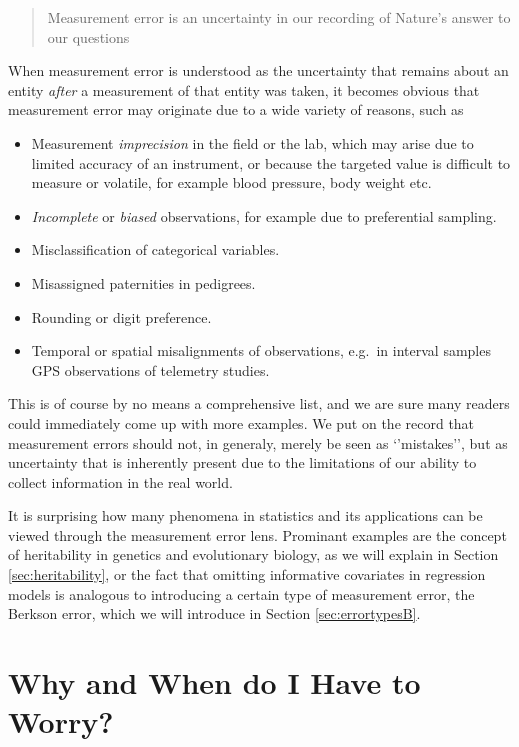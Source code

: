 \documentclass[]{book}
\providecommand{\tightlist}{%
  \setlength{\itemsep}{0pt}\setlength{\parskip}{0pt}}
\theoremstyle{definition}
\theoremstyle{definition}
\theoremstyle{definition}
\theoremstyle{remark}
\begin{document}
\begin{quote}
Measurement error is an uncertainty in our recording of Nature's answer
to our questions
\end{quote}

When measurement error is understood as the uncertainty that remains
about an entity \emph{after} a measurement of that entity was taken, it
becomes obvious that measurement error may originate due to a wide
variety of reasons, such as

\begin{itemize}
\tightlist
\item
  Measurement \emph{imprecision} in the field or the lab, which may
  arise due to limited accuracy of an instrument, or because the
  targeted value is difficult to measure or volatile, for example blood
  pressure, body weight etc.
\item
  \emph{Incomplete} or \emph{biased} observations, for example due to
  preferential sampling.
\item
  Misclassification of categorical variables.
\item
  Misassigned paternities in pedigrees.
\item
  Rounding or digit preference.
\item
  Temporal or spatial misalignments of observations, e.g.~in interval
  samples GPS observations of telemetry studies.
\end{itemize}

This is of course by no means a comprehensive list, and we are sure many
readers could immediately come up with more examples. We put on the
record that measurement errors should not, in generaly, merely be seen
as `'mistakes'', but as uncertainty that is inherently present due to
the limitations of our ability to collect information in the real world.

It is surprising how many phenomena in statistics and its applications
can be viewed through the measurement error lens. Prominant examples are
the concept of heritability in genetics and evolutionary biology, as we
will explain in Section \ref{sec:heritability}, or the fact that
omitting informative covariates in regression models is analogous to
introducing a certain type of measurement error, the Berkson error,
which we will introduce in Section \ref{sec:errortypesB}.

\section{Why and When do I Have to
Worry?}\label{why-and-when-do-i-have-to-worry}
\end{document}
